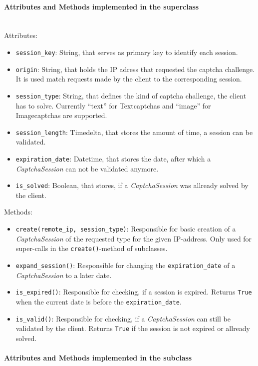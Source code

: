 \paragraph{Attributes and Methods implemented in the superclass} \mbox{} \\


Attributes:

\begin{itemize}
\item \verb|session_key|: String, that serves as primary key to identify each session. 
\item \verb|origin|: String, that holds the IP adress that requested the captcha challenge. It is used match requests made by the client to the corresponding session.
\item \verb|session_type|: String, that defines the kind of captcha challenge, the client has to solve. Currently ``text'' for Textcaptchas and ``image'' for Imagecaptchas are supported.
\item \verb|session_length|: Timedelta, that stores the amount of time, a session can be validated.
\item \verb|expiration_date|: Datetime, that stores the date, after which a \emph{CaptchaSession} can not be validated anymore.
\item \verb|is_solved|: Boolean, that stores, if a \emph{CaptchaSession} was allready solved by the client.
\end{itemize}


Methods:

\begin{itemize} 
\item \verb|create(remote_ip, session_type)|: Responsible for basic creation of a \emph{CaptchaSession} of the requested type for the given IP-address. Only used for super-calls in the \verb|create()|-method of subclasses.
\item \verb|expand_session()|: Responsible for changing the \verb|expiration_date| of a \emph{CaptchaSession} to a later date.
\item \verb|is_expired()|: Responsible for checking, if a session is expired. Returns \verb|True| when the current date is before the \verb|expiration_date|.
\item \verb|is_valid()|: Responsible for checking, if a \emph{CaptchaSession} can still be validated by the client. Returns \verb|True| if the session is not expired or allready solved.
\end{itemize}


\paragraph{Attributes and Methods implemented in the subclass} \mbox{} \\


